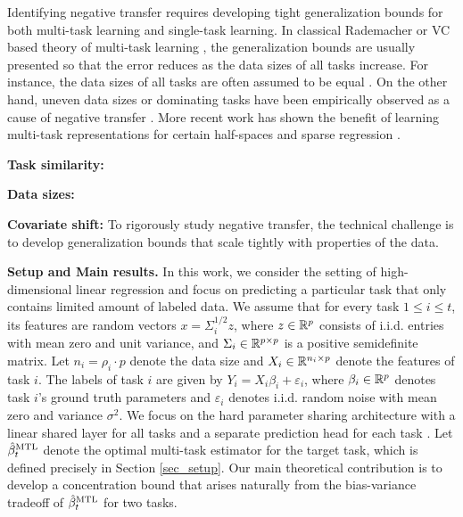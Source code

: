 Identifying negative transfer requires developing tight generalization bounds for both multi-task learning and single-task learning.
In classical Rademacher or VC based theory of multi-task learning \cite{B00,AZ05,M06}, the generalization bounds are usually presented so that the error reduces as the data sizes of all tasks increase.
For instance, the data sizes of all tasks are often assumed to be equal \cite{B00}.
On the other hand, uneven data sizes or dominating tasks have been empirically observed as a cause of negative transfer \cite{YKGLHF20}.
More recent work has shown the benefit of learning multi-task representations for certain half-spaces \cite{MPR16} and sparse regression \cite{LPTV09,LPVT11}.
\squishlist
	\item \textbf{Task similarity:}
	\item \textbf{Data sizes:}
	\item \textbf{Covariate shift:}
\squishend
To rigorously study negative transfer, the technical challenge is to develop generalization bounds that scale tightly with properties of the data.


\textbf{Setup and Main results.}
In this work, we consider the setting of high-dimensional linear regression \cite{HMRT19,BLLT20} and focus on predicting a particular task that only contains limited amount of labeled data.
We assume that for every task $1\le i\le t$, its features are random vectors $x = \Sigma_i^{1/2}z$, where $z\in\mathbb{R}^p$ consists of i.i.d. entries with mean zero and unit variance, and $\Sigma_i\in\mathbb{R}^{p\times p}$ is a positive semidefinite matrix.
Let $n_i = \rho_i \cdot p$ denote the data size and $X_i\in\mathbb{R}^{n_i\times p}$ denote the features of task $i$.
The labels of task $i$ are given by $Y_i = X_i\beta_i + \varepsilon_i$, where $\beta_i\in\mathbb{R}^p$ denotes task $i$'s ground truth parameters and $\varepsilon_i$ denotes i.i.d. random noise with mean zero and variance $\sigma^2$.
We focus on the hard parameter sharing architecture with a linear shared layer for all tasks and a separate prediction head for each task \cite{R17,MTDNN19,WZR20}.
Let $\hat{\beta}_t^{\text{MTL}}$ denote the optimal multi-task estimator for the target task, which is defined precisely in Section \ref{sec_setup}.
Our main theoretical contribution is to develop a concentration bound that arises naturally from the bias-variance tradeoff of $\hat{\beta}_t^{\text{MTL}}$ for two tasks.

